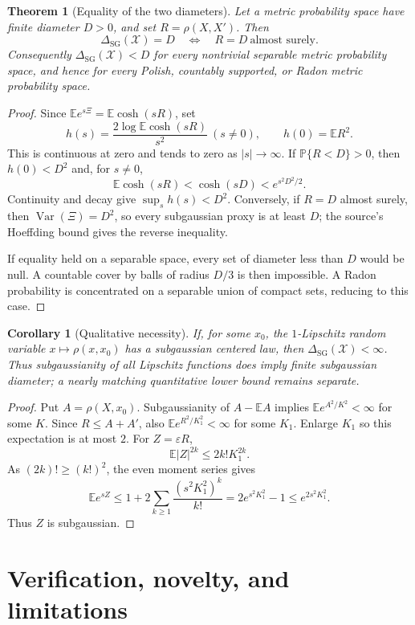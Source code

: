 \documentclass[11pt]{article}
\newtheorem{theorem}{Theorem}
\newtheorem{corollary}{Corollary}
\newcommand{\DSG}{\Delta_{\mathrm{SG}}}
\newcommand{\E}{\mathbb E}
\newcommand{\Pp}{\mathbb P}
\begin{document}
\begin{theorem}[Equality of the two diameters]\label{thm:equality}
Let a metric probability space have finite diameter $D>0$, and set
$R=\rho(X,X')$. Then
\[
       \DSG(\mathcal X)=D
       \quad\Longleftrightarrow\quad R=D\ \text{almost surely}.
\]
Consequently $\DSG(\mathcal X)<D$ for every nontrivial separable metric
probability space, and hence for every Polish, countably supported, or Radon
metric probability space.
\end{theorem}

\begin{proof}
Since $\E e^{s\Xi}=\E\cosh(sR)$, set
\[
 h(s)=\frac{2\log\E\cosh(sR)}{s^2}\ (s\ne0),\qquad h(0)=\E R^2.
\]
This is continuous at zero and tends to zero as $|s|\to\infty$. If
$\Pp\{R<D\}>0$, then $h(0)<D^2$ and, for $s\ne0$,
\[
 \E\cosh(sR)<\cosh(sD)<e^{s^2D^2/2}.
\]
Continuity and decay give $\sup_s h(s)<D^2$. Conversely, if $R=D$ almost
surely, then $\operatorname{Var}(\Xi)=D^2$, so every subgaussian proxy is at
least $D$; the source's Hoeffding bound gives the reverse inequality.

If equality held on a separable space, every set of diameter less than $D$
would be null. A countable cover by balls of radius $D/3$ is then impossible.
A Radon probability is concentrated on a separable union of compact sets,
reducing to this case.
\end{proof}

\begin{corollary}[Qualitative necessity]
If, for some $x_0$, the $1$-Lipschitz random variable
$x\mapsto\rho(x,x_0)$ has a subgaussian centered law, then
$\DSG(\mathcal X)<\infty$. Thus subgaussianity of all Lipschitz functions
does imply finite subgaussian diameter; a nearly matching quantitative lower
bound remains separate.
\end{corollary}

\begin{proof}
Put $A=\rho(X,x_0)$. Subgaussianity of $A-\E A$ implies
$\E e^{A^2/K^2}<\infty$ for some $K$. Since
$R\leq A+A'$, also $\E e^{R^2/K_1^2}<\infty$ for some $K_1$. Enlarge $K_1$
so this expectation is at most $2$. For $Z=\varepsilon R$,
\[
 \E |Z|^{2k}\leq2k!K_1^{2k}.
\]
As $(2k)!\geq(k!)^2$, the even moment series gives
\[
 \E e^{sZ}\leq1+2\sum_{k\geq1}\frac{(s^2K_1^2)^k}{k!}
 =2e^{s^2K_1^2}-1\leq e^{2s^2K_1^2}.
\]
Thus $Z$ is subgaussian.
\end{proof}

\section{Verification, novelty, and limitations}
\end{document}
